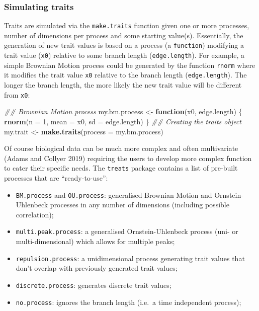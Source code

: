 \documentclass[
]{article}
\newenvironment{Shaded}{\begin{snugshade}}{\end{snugshade}}
\newcommand{\CommentTok}[1]{\textcolor[rgb]{0.56,0.35,0.01}{\textit{#1}}}
\newcommand{\ControlFlowTok}[1]{\textcolor[rgb]{0.13,0.29,0.53}{\textbf{#1}}}
\newcommand{\DataTypeTok}[1]{\textcolor[rgb]{0.13,0.29,0.53}{#1}}
\newcommand{\DecValTok}[1]{\textcolor[rgb]{0.00,0.00,0.81}{#1}}
\newcommand{\KeywordTok}[1]{\textcolor[rgb]{0.13,0.29,0.53}{\textbf{#1}}}
\newcommand{\NormalTok}[1]{#1}
\newcommand{\StringTok}[1]{\textcolor[rgb]{0.31,0.60,0.02}{#1}}
\providecommand{\tightlist}{%
  \setlength{\itemsep}{0pt}\setlength{\parskip}{0pt}}
\begin{document}
\hypertarget{simulating-traits}{%
\subsubsection{Simulating traits}\label{simulating-traits}}

Traits are simulated via the \texttt{make.traits} function given one or
more processes, number of dimensions per process and some starting
value(s). Essentially, the generation of new trait values is based on a
process (a \texttt{function}) modifying a trait value (\texttt{x0})
relative to some branch length (\texttt{edge.length}). For example, a
simple Brownian Motion process could be generated by the function
\texttt{rnorm} where it modifies the trait value \texttt{x0} relative to
the branch length (\texttt{edge.length}). The longer the branch length,
the more likely the new trait value will be different from \texttt{x0}:

\begin{Shaded}
\begin{Highlighting}[]
\CommentTok{\#\# Brownian Motion process}
\NormalTok{my.bm.process \textless{}{-}}\StringTok{ }\ControlFlowTok{function}\NormalTok{(x0, edge.length) \{}
    \KeywordTok{rnorm}\NormalTok{(}\DataTypeTok{n =} \DecValTok{1}\NormalTok{, }\DataTypeTok{mean =}\NormalTok{ x0, }\DataTypeTok{sd =}\NormalTok{ edge.length)}
\NormalTok{\} }
\CommentTok{\#\# Creating the traits object}
\NormalTok{my.trait \textless{}{-}}\StringTok{ }\KeywordTok{make.traits}\NormalTok{(}\DataTypeTok{process =}\NormalTok{ my.bm.process)}
\end{Highlighting}
\end{Shaded}

Of course biological data can be much more complex and often
multivariate (Adams and Collyer 2019) requiring the users to develop
more complex function to cater their specific needs. The \texttt{treats}
package contains a list of pre-built processes that are
``ready-to-use'':

\begin{itemize}
\tightlist
\item
  \texttt{BM.process} and \texttt{OU.process}: generalised Brownian
  Motion and Ornstein-Uhlenbeck processes in any number of dimensions
  (including possible correlation);
\item
  \texttt{multi.peak.process}: a generalised Ornstein-Uhlenbeck process
  (uni- or multi-dimensional) which allows for multiple peaks;
\item
  \texttt{repulsion.process}: a unidimensional process generating trait
  values that don't overlap with previously generated trait values;
\item
  \texttt{discrete.process}: generates discrete trait values;
\item
  \texttt{no.process}: ignores the branch length (i.e.~a time
  independent process);
\end{itemize}
\end{document}
